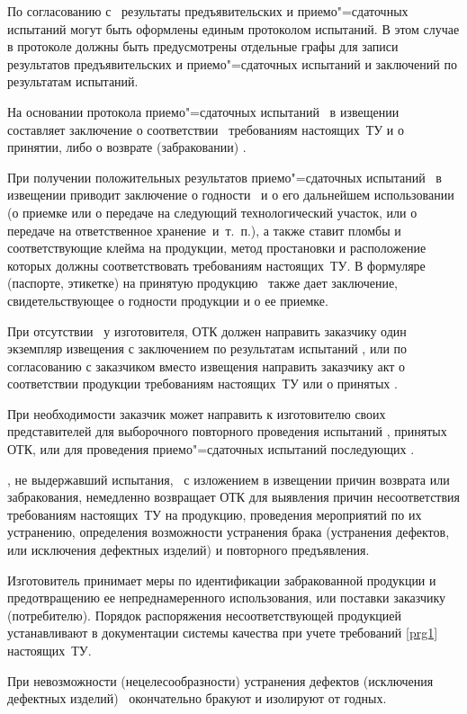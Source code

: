 \subpoint
По согласованию с \client \ результаты предъявительских и приемо"=сдаточных испытаний могут быть оформлены единым протоколом испытаний. В этом случае в протоколе должны быть предусмотрены отдельные графы для записи результатов предъявительских и приемо"=сдаточных испытаний и заключений по результатам испытаний.

\subpoint
На основании протокола приемо"=сдаточных испытаний \client \ в извещении составляет заключение о соответствии \dut \ требованиям настоящих~ТУ и о принятии, либо о возврате (забраковании) \dut.

\point
При получении положительных результатов приемо"=сдаточных испытаний \client \ в извещении приводит заключение о годности \dut \ и о его дальнейшем использовании (о приемке или о передаче на следующий технологический участок, или о передаче на ответственное хранение~и~т.~п.), а также ставит пломбы и соответствующие клейма на продукции, метод простановки и расположение которых должны соответствовать требованиям настоящих~ТУ. В формуляре (паспорте, этикетке) на принятую продукцию \client \ также дает заключение, свидетельствующее о годности продукции и о ее приемке.

\point
При отсутствии \client \ у изготовителя, ОТК должен направить заказчику один экземпляр извещения с заключением по результатам испытаний \dut, или по согласованию с заказчиком вместо извещения направить заказчику акт о соответствии продукции требованиям настоящих~ТУ или о принятых  \dut.

При необходимости заказчик может направить к изготовителю своих представителей для выборочного повторного проведения испытаний  \dut, принятых ОТК, или для проведения приемо"=сдаточных испытаний последующих \dut.

\point 
\dut, не выдержавший испытания, \client \, с изложением в извещении причин возврата или забракования, немедленно возвращает ОТК для выявления причин несоответствия требованиям настоящих~ТУ на продукцию, проведения мероприятий по их устранению, определения возможности устранения брака (устранения дефектов, или исключения дефектных изделий) и повторного предъявления.

Изготовитель принимает меры по идентификации забракованной продукции и предотвращению ее непреднамеренного использования, или поставки заказчику (потребителю). Порядок распоряжения несоответствующей продукцией устанавливают в документации системы качества при учете требований  \ref{prg1} настоящих~ТУ.

При невозможности (нецелесообразности) устранения дефектов (исключения дефектных изделий) \dut \   окончательно бракуют и изолируют от годных.

